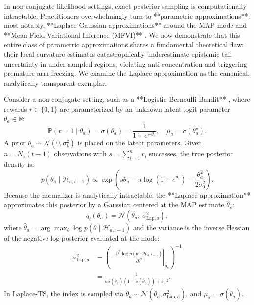 \documentclass[twoside]{article}
\begin{document}
In non-conjugate likelihood settings, exact posterior sampling is computationally intractable. Practitioners overwhelmingly turn to **parametric approximations**: most notably, **Laplace Gaussian approximations** around the MAP mode \citep{chapelle2011empirical, mackay2003information, phan2019thompson, mazumdar2020approximate} and **Mean-Field Variational Inference (MFVI)** \citep{bishop2006pattern, riquelme2018deep}. We now demonstrate that this entire class of parametric approximations shares a fundamental theoretical flaw: their local curvature estimates catastrophically underestimate epistemic tail uncertainty in under-sampled regions, violating anti-concentration and triggering premature arm freezing. We examine the Laplace approximation as the canonical, analytically transparent exemplar.

Consider a non-conjugate setting, such as a **Logistic Bernoulli Bandit** \citep{chapelle2011empirical}, where rewards $r \in \{0, 1\}$ are parameterized by an unknown latent logit parameter $\theta_a \in \mathbb{R}$:
\begin{equation}
\mathbb{P}(r = 1 \mid \theta_a) = \sigma(\theta_a) = \frac{1}{1 + e^{-\theta_a}}, \quad \mu_a = \sigma(\theta_a^\star).
\end{equation}
A prior $\theta_a \sim \mathcal{N}(0, \sigma_0^2)$ is placed on the latent parameters. Given $n = N_a(t-1)$ observations with $s = \sum_{i=1}^n r_i$ successes, the true posterior density is:
\begin{equation}
p(\theta_a \mid \mathcal{H}_{a, t-1}) \propto \exp\left( s \theta_a - n \log(1 + e^{\theta_a}) - \frac{\theta_a^2}{2\sigma_0^2} \right).
\end{equation}
Because the normalizer is analytically intractable, the **Laplace approximation** approximates this posterior by a Gaussian centered at the MAP estimate $\hat{\theta}_a$:
\begin{equation}
q_t(\theta_a) = \mathcal{N}\left( \hat{\theta}_a, \; \sigma_{\text{Lap}, a}^2 \right),
\end{equation}
where $\hat{\theta}_a = \arg\max_\theta \log p(\theta \mid \mathcal{H}_{a, t-1})$ and the variance is the inverse Hessian of the negative log-posterior evaluated at the mode:
\begin{equation}
\label{eq:laplace_var}
\begin{aligned}
\sigma_{\text{Lap}, a}^2 &= \left( -\left.\frac{\partial^2 \log p(\theta \mid \mathcal{H}_{a, t-1})}{\partial \theta^2}\right|_{\hat{\theta}_a} \right)^{-1} \\
&= \frac{1}{n \sigma(\hat{\theta}_a)(1 - \sigma(\hat{\theta}_a)) + \sigma_0^{-2}}.
\end{aligned}
\end{equation}
In Laplace-TS, the index is sampled via $\tilde{\theta}_a \sim \mathcal{N}(\hat{\theta}_a, \sigma_{\text{Lap}, a}^2)$, and $\tilde{\mu}_a = \sigma(\tilde{\theta}_a)$.
\end{document}
